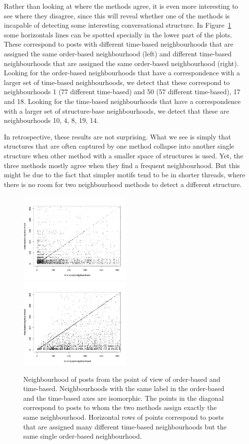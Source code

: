 \documentclass[conference]{IEEEtran}
\begin{document}
Rather than looking at where the methods agree, it is even more interesting to see where they disagree, since this will reveal whether one of the methods is incapable of detecting some interesting conversational structure. In Figure~\ref{fig:confusion} some horizontals lines can be spotted specially in the lower part of the plots. These correspond to posts with different time-based neighbourhoods that are assigned the same order-based neighbourhood (left) and different time-based neighbourhoods that are assigned the same order-based neighbourhood (right). Looking for the order-based neighbourhoods that have a correspondence with a larger set of time-based neighbourhoods, we detect that these correspond to neighbourhoods 1 (77 different time-based) and 50 (57 different time-based), 17 and 18. Looking for the time-based neighbourhoods that have a correspondence with a larger set of structure-base neighbourhoods, we detect that these are neighbourhoods 10, 4, 8, 19, 14.

In retrospective, these results are not surprising. What we see is simply that structures that are often captured by one method collapse into another single structure when other method with a smaller space of structures is used. Yet, the three methods mostly agree when they find a frequent neighbourhood. But this might be due to the fact that simpler motifs tend to be in shorter threads, where there is no room for two neighbourhood methods to detect a different structure.

\begin{figure}
\centering
\includegraphics[width=0.5\textwidth]{confusion_time_order}%
\includegraphics[width=0.5\textwidth]{confusion_struct_time}
\caption{Neighbourhood of posts from the point of view of order-based and time-based. Neighbourhoods with the same label in the order-based and the time-based axes are isomorphic. The points in the diagonal correspond to posts to whom the two methods assign exactly the same neighbourhood. Horizontal rows of points correspond to posts that are assigned many different time-based neighbourhoods but the same single order-based neighbourhood.}
\label{fig:confusion}
\end{figure}
\end{document}

